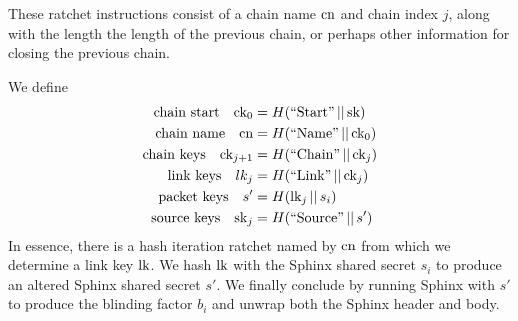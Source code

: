 \documentclass[twoside,letterpaper]{sig-alternate}
\def\mathcomma{,}
\def\mathperiod{.}
\def\mathcomma{}
\def\mathperiod{}
\begin{document}
These ratchet instructions consist of
 a chain name $\textrm{cn}$ and chain index $j$,
along with the length the length of the previous chain, or
 perhaps other information for closing the previous chain.  

We define
\[ \begin{aligned}
\textrm{chain start}\quad
 \ck_0 &= H(\textrm{``Start''} \,||\, \sk) \mathcomma \\
\textrm{chain name}\quad
 \cn &= H(\textrm{``Name''} \,||\, \ck_0) \mathcomma \\
\textrm{chain keys}\quad
 \ck_{j+1} &= H(\textrm{``Chain''} \,||\, \ck_j) \mathcomma \\
\textrm{link keys}\quad
 lk_j &= H(\textrm{``Link''} \,||\, \ck_j) \mathcomma \\
\textrm{packet keys}\quad 
 s' &= H(\lk_j \,||\, s_i) \mathcomma \\ %
\textrm{source keys}\quad 
 \sk_j &= H(\textrm{``Source''} \,||\, s') \mathperiod \\
\end{aligned} \]
In essence, there is a hash iteration ratchet named by $\textrm{cn}$
from which we determine a link key $\textrm{lk}$.
We hash $\textrm{lk}$ with the Sphinx shared secret $s_i$ to produce
an altered Sphinx shared secret $s'$.
We finally conclude by running Sphinx with $s'$ to produce the 
blinding factor $b_i$ and unwrap both the Sphinx header and body. 
\end{document}
